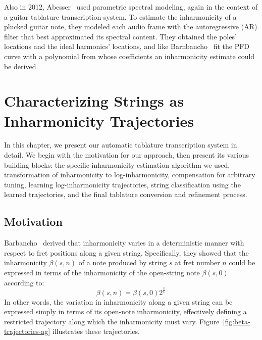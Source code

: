 \documentclass[12pt]{cmuthesis}
\begin{document}
Also in 2012, Abesser~\cite{abesser2012} used parametric spectral modeling, again in the context of a guitar tablature transcription system. To estimate the inharmonicity of a plucked guitar note, they modeled each audio frame with the autoregressive (AR) filter that best approximated its spectral content. They obtained the poles' locations and the ideal harmonics' locations, and like Barnbancho~\cite{barbanchoi2012} fit the PFD curve with a polynomial from whose coefficients an inharmonicity estimate could be derived.



\noindent
\chapter{Characterizing Strings as Inharmonicity Trajectories}
In this chapter, we present our automatic tablature transcription system in detail. We begin with the motivation for our approach, then present its various building blocks: the specific inharmonicity estimation algorithm we used, transformation of inharmonicity to log-inharmonicity, compensation for arbitrary tuning, learning log-inharmonicity trajectories, string classification using the learned trajectories, and the final tablature conversion and refinement process.
\section{Motivation}
Barbancho~\cite{barbanchoi2012} derived that inharmonicity varies in a deterministic manner with respect to fret positions along a given string. Specifically, they showed that the inharmonicity $\beta(s,n)$ of a note produced by string $s$ at fret number $n$ could be expressed in terms of the inharmonicity of the open-string note $\beta(s,0)$ according to:
\begin{equation} 
\label{eq:beta-traj}
\beta(s,n) = \beta(s,0)2^{\frac{n}{6}}
\end{equation}
In other words, the variation in inharmonicity along a given string can be expressed simply in terms of its open-note inharmonicity, effectively defining a restricted trajectory along which the inharmonicity must vary. Figure~\ref{fig:beta-trajectories-ag} illustrates these trajectories.
\end{document}
